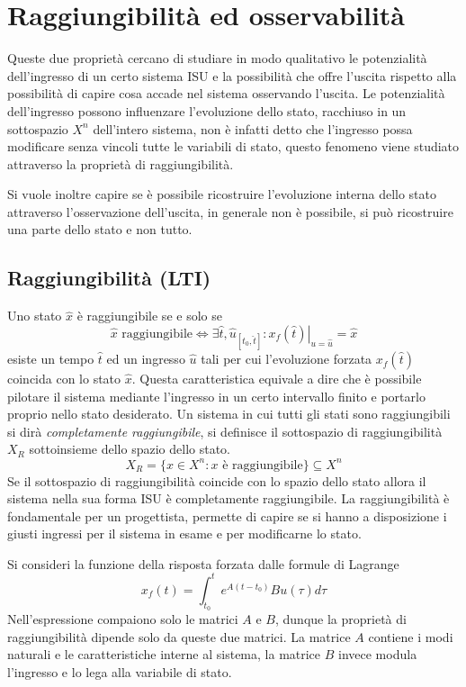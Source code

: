
\section{Raggiungibilità ed osservabilità}
Queste due proprietà cercano di studiare in modo qualitativo le potenzialità
dell'ingresso di un certo sistema ISU e la possibilità che offre l'uscita
rispetto alla possibilità di capire cosa accade nel sistema osservando l'uscita.
Le potenzialità dell'ingresso possono influenzare l'evoluzione dello stato,
racchiuso in un sottospazio $X^n$ dell'intero sistema, non è infatti detto che
l'ingresso possa modificare senza vincoli tutte le variabili di stato, questo
fenomeno viene studiato attraverso la proprietà di raggiungibilità.

Si vuole inoltre capire se è possibile ricostruire l'evoluzione interna dello
stato attraverso l'osservazione dell'uscita, in generale non è possibile, si può
ricostruire una parte dello stato e non tutto.

\subsection{Raggiungibilità (LTI)}
Uno stato $\hat{x}$ è raggiungibile se e solo se
$$
\hat{x} \text{ raggiungibile} \Leftrightarrow  \exists \hat{t},
\hat{u}_{[t_0,\hat{t}]} : \left.x_f(\hat{t})\right|_{u=\hat{u}} = \hat{x}
$$
esiste un tempo $\hat{t}$ ed un ingresso $\hat{u}$ tali per cui l'evoluzione
forzata $x_f(\hat{t})$ coincida con lo stato $\hat{x}$.
Questa caratteristica equivale a dire che è possibile pilotare il sistema
mediante l'ingresso in un certo intervallo finito e portarlo proprio nello
stato desiderato.
Un sistema in cui tutti gli stati sono raggiungibili si dirà
\textit{completamente raggiungibile}, si definisce il sottospazio di
raggiungibilità $X_R$ sottoinsieme dello spazio dello stato.
$$
X_R = \{ x\in X^n : x \text{ è raggiungibile}\} \subseteq X^n
$$
Se il sottospazio di raggiungibilità coincide con lo spazio dello stato allora
il sistema nella sua forma ISU è completamente raggiungibile.
La raggiungibilità è fondamentale per un progettista, permette di capire se si
hanno a disposizione i giusti ingressi per il sistema in esame e per
modificarne lo stato.

Si consideri la funzione della risposta forzata dalle formule di Lagrange
$$
x_f(t) = \int_{t_0}^t e^{A(t-t_0)}Bu(\tau) d\tau
$$
Nell'espressione compaiono solo le matrici $A$ e $B$, dunque la proprietà di
raggiungibilità dipende solo da queste due matrici. La matrice $A$ contiene i
modi naturali e le caratteristiche interne al sistema, la matrice $B$ invece
modula l'ingresso e lo lega alla variabile di stato.

